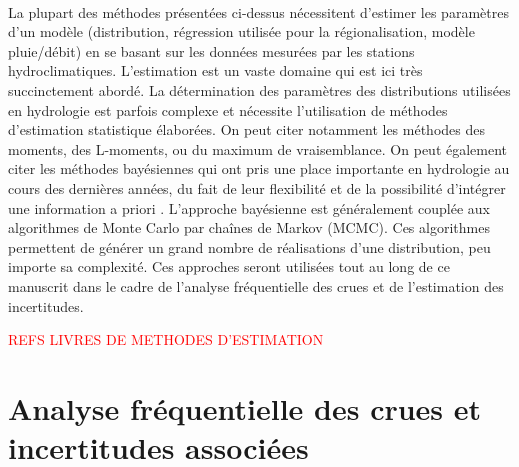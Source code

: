 	\paragraph{} La plupart des méthodes présentées ci-dessus nécessitent d'estimer les paramètres d'un modèle (distribution, régression utilisée pour la régionalisation, modèle pluie/débit) en se basant sur les données mesurées par les stations hydroclimatiques. L'estimation est un vaste domaine qui est ici très succinctement abordé. La détermination des paramètres des distributions utilisées en hydrologie est parfois complexe et nécessite l'utilisation de méthodes d'estimation statistique élaborées. On peut citer notamment les méthodes des moments, des L-moments, ou du maximum de vraisemblance. On peut également citer les méthodes bayésiennes qui ont pris une place importante en hydrologie au cours des dernières années, du fait de leur flexibilité et de la possibilité d'intégrer une information a priori \citep{renard_bayesian_2013}. L'approche bayésienne est généralement couplée aux algorithmes de Monte Carlo par chaînes de Markov (MCMC). Ces algorithmes permettent de générer un grand nombre de réalisations d'une distribution, peu importe sa complexité. Ces approches seront utilisées tout au long de ce manuscrit dans le cadre de l'analyse fréquentielle des crues et de l'estimation des incertitudes. 	
	
	\textcolor{red}{REFS LIVRES DE METHODES D'ESTIMATION}
	
	\section{Analyse fréquentielle des crues et incertitudes associées}
	
